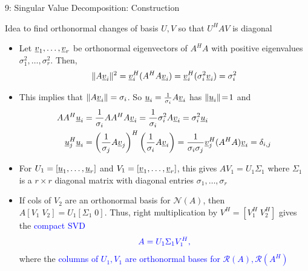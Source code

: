 \documentclass[10pt,english,aspectratio=169]{beamer}
\begin{document}
\begin{frame}{9: Singular Value Decomposition: Construction}

Idea to find orthonormal changes of basis $U,V$ so that $U^H A V$ is diagonal

\begin{itemize}
\setlength\itemsep{3mm}

\item<1-> Let $\underline{v}_1, \ldots, \underline{v}_r$ be orthonormal eigenvectors of $A^H A$ with positive eigenvalues $\sigma_1^2,\ldots,\sigma_r^2$.
Then, \[\|A \underline{v}_i\| ^2 = \underline{v}_i^H (A^H A \underline{v}_i) =  \underline{v}_i^H (\sigma_i^2\underline{v}_i) = \sigma_i^2 \]

\item<2-> This implies that $\|A \underline{v}_i\| = \sigma_i$.
So $\underline{u}_i = \frac{1}{\sigma_i} A\underline{v}_i$ has $\| \underline{u}_i \| \!=\! 1$ and \vspace{-1mm}
\begin{align*}
A A^H \vecnot{u}_i &= \frac{1}{\sigma_i} A A^H A \vecnot{v}_i = \frac{1}{\sigma_i} \sigma_i^2 A \vecnot{v}_i = \sigma_i^2 \vecnot{u}_i
\\
\vecnot{u}_j^H \vecnot{u}_i &= \left(\frac{1}{\sigma_j} A \vecnot{v}_j \right)^H \left(\frac{1}{\sigma_i} A \vecnot{v}_i \right) =\frac{1}{\sigma_i \sigma_j} \vecnot{v}_j^H (A^H A) \vecnot{v}_i = \delta_{i,j}  \vspace{-1mm}
\end{align*}


\item<3-> For $U_1 = [\underline{u}_1,\ldots,\underline{u}_r]
$ and $V_1 = [\underline{v}_1,\ldots,\underline{v}_r]$, this gives $A V_1 = U_1 \Sigma_1$ where $\Sigma_1$ is a $r \times r$ diagonal matrix with diagonal entries $\sigma_1,\ldots,\sigma_r\!\!\!\!$

\item<4-> If cols of $V_2$ are an orthonormal basis for $\mathcal{N}(A)$,
then $A[V_1 \; V_2]=U_1 [\Sigma_1 \; 0].\!\!\!\!\!\!\!\!\!\!\!$
Thus, right multiplication by $V^H = [V_1^H \; V_2^H]$ gives the \textcolor{blue}{compact SVD} \vspace{-0.5mm} \[ \color{blue} A = U_1 \Sigma_1 V_1^H, \vspace{-1.5mm}\]
where the \textcolor{blue}{columns of $U_1, V_1$ are orthonormal bases for $\mathcal{R}(A), \mathcal{R}(A^H)$}

\end{itemize}


\end{frame}
\end{document}

